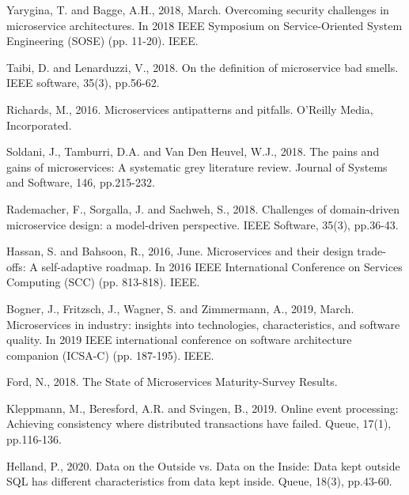 \documentclass[a4paper,12pt]{article}
\begin{document}
\begin{thebibliography}{}
Yarygina, T. and Bagge, A.H., 2018, March. Overcoming security challenges in microservice architectures. In 2018 IEEE Symposium on Service-Oriented System Engineering (SOSE) (pp. 11-20). IEEE.
	
Taibi, D. and Lenarduzzi, V., 2018. On the definition of microservice bad smells. IEEE software, 35(3), pp.56-62.
	
Richards, M., 2016. Microservices antipatterns and pitfalls. O'Reilly Media, Incorporated.
	
Soldani, J., Tamburri, D.A. and Van Den Heuvel, W.J., 2018. The pains and gains of microservices: A systematic grey literature review. Journal of Systems and Software, 146, pp.215-232.
	
Rademacher, F., Sorgalla, J. and Sachweh, S., 2018. Challenges of domain-driven microservice design: a model-driven perspective. IEEE Software, 35(3), pp.36-43.
	
Hassan, S. and Bahsoon, R., 2016, June. Microservices and their design trade-offs: A self-adaptive roadmap. In 2016 IEEE International Conference on Services Computing (SCC) (pp. 813-818). IEEE.
	
Bogner, J., Fritzsch, J., Wagner, S. and Zimmermann, A., 2019, March. Microservices in industry: insights into technologies, characteristics, and software quality. In 2019 IEEE international conference on software architecture companion (ICSA-C) (pp. 187-195). IEEE.
	
Ford, N., 2018. The State of Microservices Maturity-Survey Results.
	
Kleppmann, M., Beresford, A.R. and Svingen, B., 2019. Online event processing: Achieving consistency where distributed transactions have failed. Queue, 17(1), pp.116-136.
	
Helland, P., 2020. Data on the Outside vs. Data on the Inside: Data kept outside SQL has different characteristics from data kept inside. Queue, 18(3), pp.43-60.

\end{thebibliography}
\end{document}
